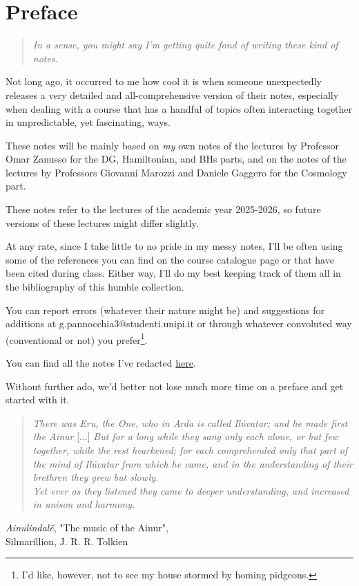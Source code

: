\chapter*{Preface}

\begin{quote}
    \emph{In a sense, you might say I'm getting quite fond of writing these kind of notes}.
\end{quote}
Not long ago, it occurred to me how cool it is when someone unexpectedly releases a very detailed and all-comprehensive version of their notes, especially when dealing with a course that has a handful of topics often interacting together in unpredictable, yet fascinating, ways.
\par These notes will be mainly based on \emph{my} own notes of the lectures by Professor Omar Zanusso for the DG, Hamiltonian, and BHs parts, and on the notes of the lectures by Professors Giovanni Marozzi and Daniele Gaggero for the Cosmology part.
\par These notes refer to the lectures of the academic year 2025-2026, so future versions of these lectures might differ slightly.
\par At any rate, since I take little to no pride in my messy notes, I'll be often using some of the references you can find on the course catalogue page or that have been cited during class. Either way, I'll do my best keeping track of them all in the bibliography of this humble collection.
\par You can report errors (whatever their nature might be) and suggestions for additions at g.pannocchia3@studenti.unipi.it or through whatever convoluted way (conventional or not) you prefer\footnote{I'd like, however, not to see my house stormed by homing pidgeons.}.
\par You can find all the notes I've redacted \href{https://github.com/gpannocchia3}{here}.
\par Without further ado, we'd better not lose much more time on a preface and get started with it.
\begin{quote}
    \emph{There was Eru, the One, who in Arda is called Ilúvatar; and he made first the Ainur} [...] \emph{But for a long while they sang only each alone, or but few together, while the rest hearkened; for each comprehended only that part of the mind of Ilúvatar from which he came, and in the understanding of their brethren they grew but slowly. \\
    Yet ever as they listened they came to deeper understanding, and increased in unison and harmony.}
\end{quote}

\begin{flushright}
    \emph{Ainulindalë}, "The music of the Ainur",\\
    Silmarillion, J. R. R. Tolkien
\end{flushright}